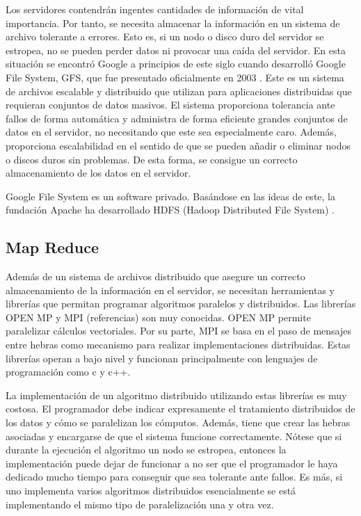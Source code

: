 \documentclass[10pt]{article}
\begin{document}
		Los servidores contendrán ingentes cantidades de información de vital importancia. Por tanto, se necesita almacenar la información en un sistema de archivo tolerante a errores. Esto es, si un nodo o disco duro del servidor se estropea, no se pueden perder datos ni provocar una caída del servidor. En esta situación se encontró Google a principios de este siglo cuando desarrolló Google File System, GFS, que fue presentado oficialmente en 2003 \cite{gfs}. Este es un sistema de archivos escalable y distribuido que utilizan para aplicaciones distribuidas que requieran conjuntos de datos masivos. El sistema proporciona tolerancia ante fallos de forma automática y administra de forma eficiente grandes conjuntos de datos en el servidor, no necesitando que este sea especialmente caro. Además, proporciona escalabilidad en el sentido de que se pueden añadir o eliminar nodos o discos duros sin problemas. De esta forma, se consigue un correcto almacenamiento de los datos en el servidor.
		
		Google File System es un software privado. Basándose en las ideas de este, la fundación Apache ha desarrollado HDFS (Hadoop Distributed File System) \cite{hdfs}.

	\subsection{Map Reduce}


		Además de un sistema de archivos distribuido que asegure un correcto almacenamiento de la información en el servidor, se necesitan herramientas y librerías que permitan programar algoritmos paralelos y distribuidos. Las librerías OPEN MP y MPI (referencias) son muy conocidas. OPEN MP permite paralelizar cálculos vectoriales. Por su parte, MPI se basa en el paso de mensajes entre hebras como mecanismo para realizar implementaciones distribuidas. Estas librerías operan a bajo nivel y funcionan principalmente con lenguajes de programación como c y c++. 
		
		La implementación de un algoritmo distribuido utilizando estas librerías es muy costosa. El programador debe indicar expresamente el tratamiento distribuidos de los datos y cómo se paralelizan los cómputos. Además, tiene que crear las hebras asociadas y encargarse de que el sistema funcione correctamente. Nótese que si durante la ejecución el algoritmo un nodo se estropea, entonces la implementación puede dejar de funcionar a no ser que el programador le haya dedicado mucho tiempo para conseguir que sea tolerante ante fallos. Es más, si uno implementa varios algoritmos distribuidos esencialmente se está implementando el mismo tipo de paralelización una y otra vez.
	
\end{document}
